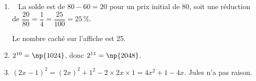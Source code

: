 
\medskip

\begin{enumerate}
\item ~
La solde est de $80 - 60 = 20$ pour un prix initial de 80, soit une réduction de $\dfrac{20}{80} = \dfrac{1}{4} = \dfrac{25}{100} = 25$\,\%.

Le nombre caché sur l’affiche est 25.
%


\item  %
$2^{10} = \np{1024}$, donc $2^{11} = \np{2048}$.
\item  %
$(2x - 1)^2 = (2x)^2 + 1^2 - 2 \times 2x \times 1 = 4x^2 + 1 - 4x$. Jules n'a pas raison.
\end{enumerate}

\vspace{0,5cm}

